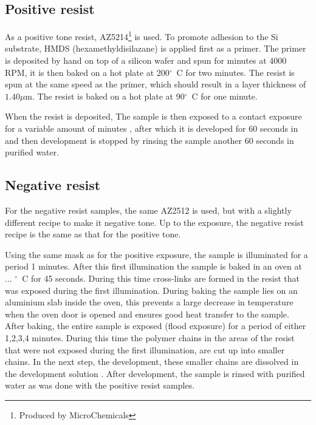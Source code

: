 \subsection*{Positive resist}
As a positive tone resist, AZ5214\footnote{Produced by MicroChemicals} is used. To promote adhesion to the Si substrate, HMDS (hexamethyldisilazane) is applied first as a primer. The primer is deposited by hand on top of a silicon wafer and spun for  minutes at 4000 RPM, it is then baked on a hot plate at 200$^{\circ}$~C for two minutes. The resist is spun at the same speed as the primer, which should result in a layer thickness of $1.40 \mu$m. The resist is baked on a hot plate at 90$^{\circ}$~C for one minute.

When the resist is deposited, The sample is then exposed to a contact  exposure for a variable amount of minutes , after which it is developed for 60 seconds in  and then development is stopped by rinsing the sample another 60 seconds in purified water.

\subsection*{Negative resist}
For the negative resist samples, the same AZ2512 is used, but with a slightly different recipe to make it negative tone. Up to the exposure, the negative resist recipe is the same as that for the positive tone. 

Using the same mask as for the positive exposure, the sample is illuminated for a period 1  minutes. After this first illumination the sample is baked in an oven at ...  $^\circ$~C for 45 seconds. During this time cross-links are formed in the resist that was exposed during the first illumination. During baking the sample lies on an aluminium slab inside the oven, this prevents a large decrease in temperature when the oven door is opened and ensures good heat transfer to the sample. After baking, the entire sample is exposed (flood exposure) for a period of either 1,2,3,4  minutes. During this time the polymer chains in the areas of the resist that were not exposed during the first illumination, are cut up into smaller chains. In the next step, the development, these smaller chains are dissolved in the development solution . After development, the sample is rinsed with purified water as was done with the positive resist samples.